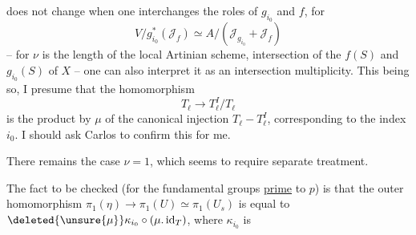 does not change when one interchanges the roles of $g_{i_0}$ and $f$, for
\[
V/g_{i_0}^*(\mathcal J_f)\simeq A/(\mathcal J_{g_{i_0}}+\mathcal J_f)
\]
-- for $\nu$ is the length of the local Artinian scheme, intersection of the  $f(S)$ and $g_{i_0}(S)$ of $X$ -- one can also interpret it as an intersection multiplicity. This being so, I presume that the homomorphism
\[
T_\ell\longrightarrow T_\ell^I/T_\ell
\]
is the product by $\mu$ of the canonical injection $T_\ell-T_\ell^I$, corresponding to the index $i_0$. I should ask Carlos to confirm this for me.

There remains the case $\nu=1$, which seems to require separate treatment.

The fact to be checked (for the fundamental groups \uline{prime} to $p$) is that the outer homomorphism $\pi_1(\eta)\longrightarrow\pi_1(U)\simeq\pi_1(U_s)$ is equal to $\deleted{\unsure{\mu}}\kappa_{i_0}\circ(\mu.\operatorname{id}_T)$, where $\kappa_{i_0}$ is
